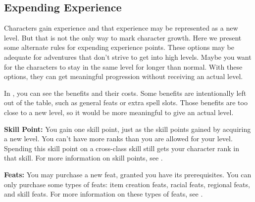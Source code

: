 \subsection{Expending Experience}
Characters gain experience and that experience may be represented as a new level. But that is not the only way to mark character growth. Here we present some alternate rules for expending experience points. These options may be adequate for adventures that don't strive to get into high levels. Maybe you want for the characters to stay in the same level for longer than normal. With these options, they can get meaningful progression without receiving an actual level.

In , you can see the benefits and their costs. Some benefits are intentionally left out of the table, such as general feats or extra spell slots. Those benefits are too close to a new level, so it would be more meaningful to give an actual level.


\textbf{Skill Point:} You gain one skill point, just as the skill points gained by acquiring a new level. You can't have more ranks than you are allowed for your level. Spending this skill point on a cross-class skill still gets your character \onehalf rank in that skill. For more information on skill points, see .

\textbf{Feats:} You may purchase a new feat, granted you have its prerequisites. You can only purchase some types of feats: item creation feats, racial feats, regional feats, and skill feats. For more information on these types of feats, see .
